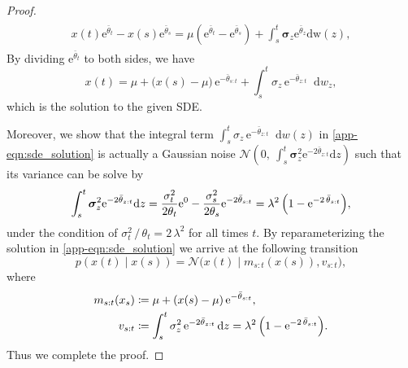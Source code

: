 \documentclass{article}
\newcommand{\diff}{\mathop{}\!\mathrm{d}}
\newcommand{\expp}{\mathrm{e}}
\newcommand{\cond}{{\;|\;}}
\theoremstyle{plain}
\theoremstyle{definition}
\theoremstyle{remark}
\begin{document}
\begin{proof}
\begin{align}
\begin{split}
    {x}(t) \expp^{{\bar{{\theta}}_t}} - {x}(s) \expp^{{\bar{{\theta}}_s}} = \mu (\expp^{\bar{{\theta}}_t} - \expp^{\bar{{\theta}}_s}) + \int_{s}^t\bm{\sigma}_z \expp^{\bar{{\theta}}_z}{\mathrm{dw}(z)},
    \label{eq:solve_integral_xt_x0}
\end{split}
\end{align}
By dividing $\expp^{{\bar{{\theta}}_t}}$ to both sides, we have
\begin{equation}
    {x}(t) = \mu + \bigl({x}(s) - \mu \bigr) \, \expp^{-\bar{\theta}_{s:t}} + \int^t_s \sigma_z \, \expp^{-\bar{\theta}_{z:t}} \diff w_z,
    \label{app-eqn:sde_solution}
\end{equation}
which is the solution to the given SDE.

Moreover, we show that the integral term $\int^t_s \sigma_z \, \expp^{-\bar{\theta}_{z:t}} \diff w(z)$ in \eqref{app-eqn:sde_solution} is actually a Gaussian noise $\mathcal{N}\left(0, \ \int_{s}^t\bm{\sigma}_z^2 \expp^{-2\bar{{\theta}}_{z:t}}{\mathrm{d}z}\right)$ such that its variance can be solve by
\begin{align}
\begin{split}
    \int_{s}^t\bm{\sigma}_z^2 \expp^{-2\bar{{\theta}}_{z:t}}{\mathrm{d}z} = \frac{\sigma_t^2}{2\theta_t}\expp^0 - \frac{\sigma_s^2}{2\theta_s} \expp^{-2\bar{{\theta}}_{s:t}} = \lambda^2 \, \Bigl(1 - \expp^{-2 \, \bar{\theta}_{s:t}}\Bigr),
    \label{app_eqm:solve_variance}
\end{split}
\end{align}
under the condition of $\sigma_t^2 \, / \, \theta_t = 2 \, \lambda^2$ for all times $t$. By reparameterizing the solution in \eqref{app-eqn:sde_solution} we arrive at the following transition
\begin{equation}
    p({x}(t) \cond {x}(s)) = \mathcal{N}\bigl({x}(t) \cond m_{s:t}({x}(s)), v_{s:t}\bigr),
\end{equation}
where
\begin{equation}
    \begin{split}
    m_{s:t}(x_s) &\coloneqq \mu + ({x}(s) - \mu) \, \expp^{-\bar{\theta}_{s:t}}, \\
    v_{s:t} &\coloneqq \int^t_s \sigma_z^2 \, \expp^{-2\bar{\theta}_{z:t}} \diff z = \lambda^2 \, \Bigl(1 - \expp^{-2 \, \bar{\theta}_{s:t}}\Bigr).
    \end{split}
\end{equation}
Thus we complete the proof.
\end{proof}
\end{document}
